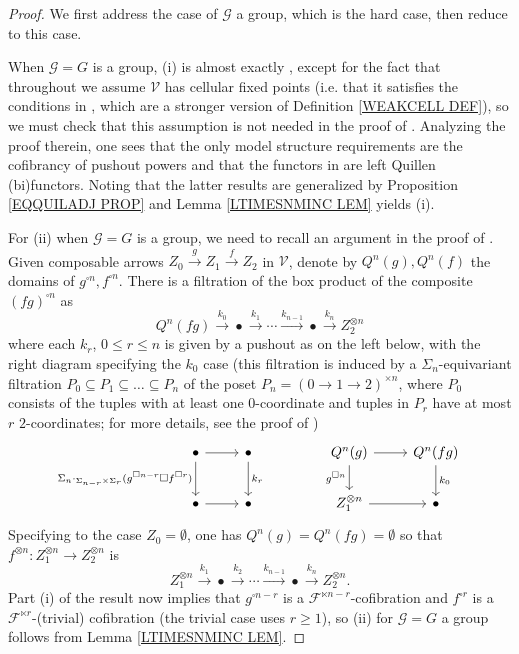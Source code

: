 \documentclass[a4paper,10pt
,draft
]{article}%
\numberwithin{equation}{section}
\numberwithin{figure}{section}
\theoremstyle{definition} %
\newcommand{\F}{\ensuremath{\mathcal F}}
\newcommand{\V}{\ensuremath{\mathcal V}}
\newcommand{\G}{\ensuremath{\mathcal G}}
\newcommand{\1}{\ensuremath{\mathbbm 1}}%
\begin{document}
\begin{proof}
We first address the case of $\G$ a group, 
which is the hard case, then reduce to this case.

When $\G = G$ is a group, 
(i) is almost exactly \cite[Prop. 6.24]{BP_geo}, 
except for the fact that throughout \cite{BP_geo}
we assume $\V$ has cellular fixed points
(i.e. that it satisfies the conditions in 
\cite[Prop. 2.6]{Ste16}, which are a stronger version of Definition \ref{WEAKCELL DEF}), 
so we must check that this assumption is not needed in the proof of 
\cite[Prop. 6.24]{BP_geo}.
Analyzing the proof therein, one sees that the only model structure requirements are the cofibrancy of pushout powers
and that the functors in 
\cite[Props 6.5 and 6.23]{BP_geo}
are left Quillen (bi)functors.
Noting that the latter results are generalized by Proposition \ref{EQQUILADJ PROP} and Lemma \ref{LTIMESNMINC LEM} yields (i).



For (ii) when $\G=G$ is a group, we need to recall an argument 
in the proof of \cite[Prop. 6.25]{BP_geo}. 
%
Given composable arrows $Z_0 \xrightarrow{g} Z_1 \xrightarrow{f} Z_2$ in $\V$,
denote by $Q^n(g), Q^n(f)$ the domains of $g^{\square n}, f^{\square n}$.
There is a filtration of the box product of the composite
$(fg)^{\square n}$ as
\[
	Q^n(fg)
\xrightarrow{k_0}
	\bullet
\xrightarrow{k_1}
	\cdots
\xrightarrow{k_{n-1}}
	\bullet
\xrightarrow{k_{n}}
	Z_2^{\otimes n}
\] 
where each $k_r$, $0\leq r \leq n$ is given by a pushout as on the left below, with the right diagram specifying the $k_0$ case
(this filtration is induced by a $\Sigma_n$-equivariant filtration 
$P_0 \subseteq P_1 \subseteq \dots \subseteq P_n$ of the poset $P_n = (0 \to 1 \to 2)^{\times n}$,
where $P_0$ consists of the tuples with at least one $0$-coordinate 
and tuples in $P_r$ have at most $r$ $2$-coordinates;
for more details, see the proof of \cite[Lemma 4.8]{Pe16})
\begin{equation}\label{HGBOX_EQ}
	\begin{tikzcd}
		\bullet 
		\arrow[d, "\Sigma_n \cdot_{\Sigma_{n-r} \times \Sigma_r} (g^{\square n-r} \square f^{\square r})"'] \arrow[r]
	&
		\bullet \arrow[d, "k_r"]
	& &%
		Q^n(g) \arrow[r] \arrow[d, "g^{\square n}"']
	&
		Q^n(fg) \arrow[d, "k_0"]
\\
		\bullet \arrow[r]
	&
		\bullet
	& &%
		Z_1^{\otimes n} \arrow[r]
	&
		\bullet
	\end{tikzcd}
\end{equation}
Specifying to the case $Z_0 = \emptyset$, one has
$Q^n(g)= Q^n(fg) = \emptyset$
so that $f^{\otimes n} \colon Z_1^{\otimes n} \to Z_2^{\otimes n}$
is
\[
	Z_1^{\otimes n}
\xrightarrow{k_1}
	\bullet
\xrightarrow{k_2}
	\cdots
\xrightarrow{k_{n-1}}
	\bullet
\xrightarrow{k_{n}}
	Z_2^{\otimes n}.
\] 
Part (i) of the result now implies that 
$g^{\square n-r}$
is a $\F^{\ltimes n-r}$-cofibration
and
$f^{\square r}$
is a $\F^{\ltimes r}$-(trivial) cofibration
(the trivial case uses $r\geq 1$),
so (ii) for $\G=G$ a group follows from 
Lemma \ref{LTIMESNMINC LEM}.



\end{proof}
\end{document}
